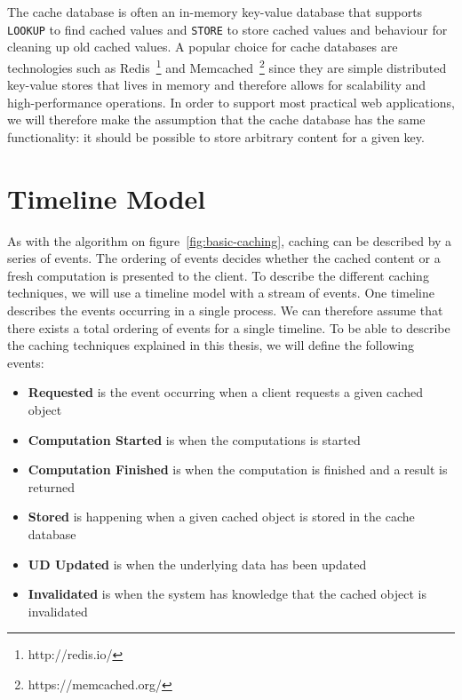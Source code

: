 The cache database is often an in-memory key-value database that supports \verb$LOOKUP$ to find cached values and \verb$STORE$ to store cached values and behaviour for cleaning up old cached values. A popular choice for cache databases are technologies such as Redis~\footnote{http://redis.io/} and Memcached~\footnote{https://memcached.org/} since they are simple distributed key-value stores that lives in memory and therefore allows for scalability and high-performance operations. In order to support most practical web applications, we will therefore make the assumption that the cache database has the same functionality: it should be possible to store arbitrary content for a given key.


\section{Timeline Model}
\label{sec:timeline-model}

As with the algorithm on figure~\ref{fig:basic-caching}, caching can be described by a series of events. The ordering of events decides whether the cached content or a fresh computation is presented to the client. To describe the different caching techniques, we will use a timeline model with a stream of events. One timeline describes the events occurring in a single process. We can therefore assume that there exists a total ordering of events for a single timeline. To be able to describe the caching techniques explained in this thesis, we will define the following events:

\begin{itemize}
  \item \textbf{Requested} is the event occurring when a client requests a given cached object
  \item \textbf{Computation Started} is when the computations is started
  \item \textbf{Computation Finished} is when the computation is finished and a result is returned
  \item \textbf{Stored} is happening when a given cached object is stored in the cache database
  \item \textbf{UD Updated} is when the underlying data has been updated
  \item \textbf{Invalidated} is when the system has knowledge that the cached object is invalidated
\end{itemize}

